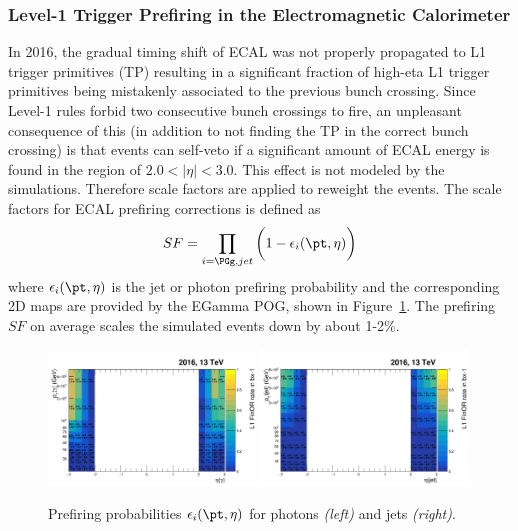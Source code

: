 \subsubsection{Level-1 Trigger Prefiring in the Electromagnetic Calorimeter}
In 2016, the gradual timing shift of ECAL was not properly propagated to L1 trigger primitives (TP) resulting in a significant fraction of high-eta L1 trigger primitives being mistakenly associated to the previous bunch crossing. Since Level-1 rules forbid two consecutive bunch crossings to fire, an unpleasant consequence of this (in addition to not finding the TP in the correct bunch crossing) is that events can self-veto if a significant amount of ECAL energy is found in the region of $2.0<|\eta|<3.0$. This effect is not modeled by the simulations. Therefore scale factors are applied to reweight the events. The scale factors for ECAL prefiring corrections is defined as
\begin{equation*}
    SF = \prod_{i=\PGg,jet}\bigg(1-\epsilon_i(\pt, \eta) \bigg)
\end{equation*}
\noindent where $\epsilon_i(\pt, \eta)$ is the jet or photon prefiring probability and the corresponding 2D maps are provided by the EGamma POG, shown in Figure~\ref{fig:analysis:calibration:prefiring}. The prefiring $SF$ on average scales the simulated events down by about 1-2\%.
\begin{figure}[ht]
    \centering
    \includegraphics[width=0.49\textwidth]{chapters/Analysis/sectionCalibration/figures/prefiring/L1prefiring_photonpt_2016BtoH.png}
    \includegraphics[width=0.49\textwidth]{chapters/Analysis/sectionCalibration/figures/prefiring/L1prefiring_jetpt_2016BtoH.png} 
    \caption{ Prefiring probabilities $\epsilon_i(\pt, \eta)$ for photons \emph{(left)} and jets \emph{(right)}. } 
    \label{fig:analysis:calibration:prefiring}
\end{figure}

